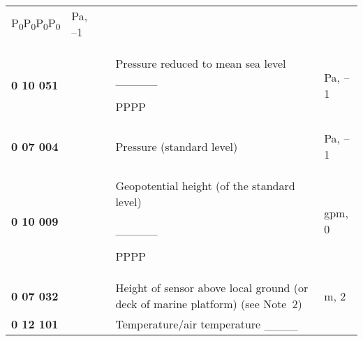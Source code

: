 \begin{longtable}[]{@{}lllll@{}}
\begin{minipage}[t]{0.17\columnwidth}
P\textsubscript{0}P\textsubscript{0}P\textsubscript{0}P\textsubscript{0}\strut
\end{minipage} & \begin{minipage}[t]{0.17\columnwidth}\raggedright
Pa, --1\strut
\end{minipage}\tabularnewline
\begin{minipage}[t]{0.17\columnwidth}\raggedright
\textbf{0 10 051}\strut
\end{minipage} & \begin{minipage}[t]{0.17\columnwidth}\raggedright
\strut
\end{minipage} & \begin{minipage}[t]{0.17\columnwidth}\raggedright
\strut
\end{minipage} & \begin{minipage}[t]{0.17\columnwidth}\raggedright
Pressure reduced to mean sea level \_\_\_\_\_

PPPP\strut
\end{minipage} & \begin{minipage}[t]{0.17\columnwidth}\raggedright
Pa, --1\strut
\end{minipage}\tabularnewline
\textbf{0 07 004} & & & Pressure (standard level) & Pa, --1\tabularnewline
\begin{minipage}[t]{0.17\columnwidth}\raggedright
\textbf{0 10 009}\strut
\end{minipage} & \begin{minipage}[t]{0.17\columnwidth}\raggedright
\strut
\end{minipage} & \begin{minipage}[t]{0.17\columnwidth}\raggedright
\strut
\end{minipage} & \begin{minipage}[t]{0.17\columnwidth}\raggedright
Geopotential height (of the standard level)

\_\_\_\_\_

PPPP\strut
\end{minipage} & \begin{minipage}[t]{0.17\columnwidth}\raggedright
gpm, 0\strut
\end{minipage}\tabularnewline
\textbf{0 07 032} & & & Height of sensor above local ground (or deck of marine platform) (see Note~2) & m, 2\tabularnewline
\begin{minipage}[t]{0.17\columnwidth}\raggedright
\textbf{0 12 101}\strut
\end{minipage} & \begin{minipage}[t]{0.17\columnwidth}\raggedright
\strut
\end{minipage} & \begin{minipage}[t]{0.17\columnwidth}\raggedright
\strut
\end{minipage} & \begin{minipage}[t]{0.17\columnwidth}\raggedright
Temperature/air temperature \_\_\_\_


\end{minipage}
\end{longtable}
